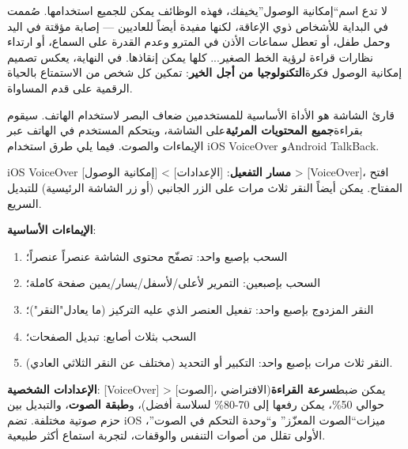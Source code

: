 لا تدع اسم“إمكانية الوصول”يخيفك، فهذه الوظائف يمكن للجميع استخدامها. صُممت في البداية للأشخاص ذوي الإعاقة، لكنها مفيدة أيضاً للعاديين — إصابة مؤقتة في اليد وحمل طفل، أو تعطل سماعات الأذن في المترو وعدم القدرة على السماع، أو ارتداء نظارات قراءة لرؤية الخط الصغير... كلها يمكن إنقاذها. في النهاية، يعكس تصميم إمكانية الوصول فكرة\textbf{التكنولوجيا من أجل الخير}: تمكين كل شخص من الاستمتاع بالحياة الرقمية على قدم المساواة.


قارئ الشاشة هو الأداة الأساسية للمستخدمين ضعاف البصر لاستخدام الهاتف. سيقوم بقراءة\textbf{جميع المحتويات المرئية}على الشاشة، ويتحكم المستخدم في الهاتف عبر الإيماءات والصوت. فيما يلي طرق استخدام iOS VoiceOver وAndroid TalkBack.

\begin{tcbinfo}{iOS VoiceOver}
\textbf{مسار التفعيل}: [الإعدادات] > [إمكانية الوصول] > [VoiceOver]، افتح المفتاح. يمكن أيضاً النقر ثلاث مرات على الزر الجانبي (أو زر الشاشة الرئيسية) للتبديل السريع.

\textbf{الإيماءات الأساسية}:

\begin{enumerate}
  \item السحب بإصبع واحد: تصفّح محتوى الشاشة عنصراً عنصراً؛
  \item السحب بإصبعين: التمرير لأعلى/لأسفل/يسار/يمين صفحة كاملة؛
  \item النقر المزدوج بإصبع واحد: تفعيل العنصر الذي عليه التركيز (ما يعادل"النقر")؛
  \item السحب بثلاث أصابع: تبديل الصفحات؛
  \item النقر ثلاث مرات بإصبع واحد: التكبير أو التحديد (مختلف عن النقر الثلاثي العادي).
\end{enumerate}

\textbf{الإعدادات الشخصية}: [VoiceOver] > [الصوت]، يمكن ضبط\textbf{سرعة القراءة}(الافتراضي حوالي 50\%، يمكن رفعها إلى 70-80\% لسلاسة أفضل)، و\textbf{طبقة الصوت}، والتبديل بين حزم صوتية مختلفة. تضم iOS ميزات“الصوت المعزّز” و“وحدة التحكم في الصوت”، الأولى تقلل من أصوات التنفس والوقفات، لتجربة استماع أكثر طبيعية.

\end{tcbinfo}


